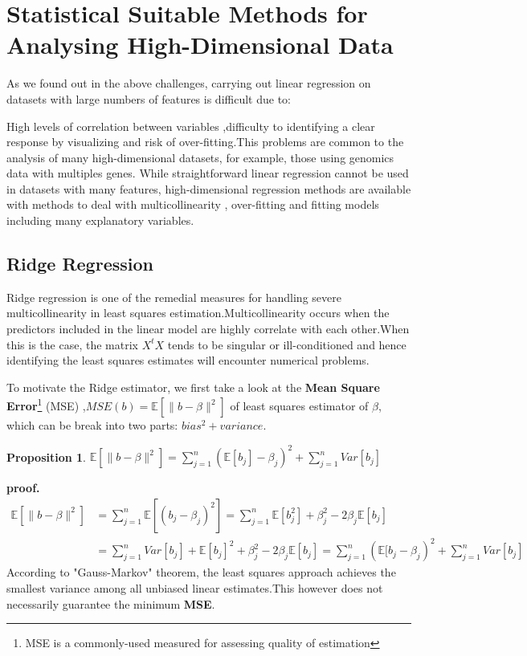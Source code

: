 \documentclass[12pt]{report}
\newtheorem {proposition}{Proposition}[section]  %
\begin{document}
	\section{Statistical Suitable Methods for Analysing High-Dimensional Data}
	As we found out in the above challenges, carrying out linear regression on datasets with large numbers of features is difficult due to: 
	
	High levels of correlation between variables ,difficulty to identifying a clear response by visualizing and risk of over-fitting.This problems are common to the analysis of many high-dimensional datasets, for example, those using genomics data with multiples genes. While straightforward linear regression cannot be used in datasets with many features, high-dimensional regression methods are available with methods to deal with multicollinearity , over-fitting and fitting models including many explanatory variables.
	\subsection{Ridge Regression}
	\label{rre}
	Ridge regression is one of the remedial measures for handling severe multicollinearity in least squares estimation.Multicollinearity occurs when the predictors included in the linear model are highly correlate with each other.When this is the case, the matrix $X^{t}X$ tends to be singular or ill-conditioned and hence identifying the least squares estimates will encounter numerical problems.
	
	To motivate the Ridge estimator, we first take a look at the \textbf{Mean Square Error}\footnote{MSE is a commonly-used measured for assessing quality of estimation} (MSE) ,$MSE(b)=\mathbb{E}[\parallel b-\beta \parallel^{2}]$ of least squares estimator of $\beta$, which can be break into two parts: $bias^{2} + variance$.
	\begin{proposition}
		$	\mathbb{E}[\parallel b-\beta \parallel^{2}]	=\sum_{j=1}^{n}	(\mathbb{E}[b_{j}]-\beta_{j})^{2} + \sum_{j=1}^{n}	Var[b_{j}]$
	\end{proposition}
	\textbf{proof.}
	{\selectfont
		\begin{align*}
			\mathbb{E}[\parallel b-\beta \parallel^{2}]&=\sum_{j=1}^{n}	\mathbb{E}[(b_{j}-\beta_{j})^{2}]
			=\sum_{j=1}^{n}	\mathbb{E}[b_{j}^{2}]+\beta_{j}^{2} -2\beta_{j}\mathbb{E}[b_{j}]\\
			&=\sum_{j=1}^{n}	Var[b_{j}]+\mathbb{E}[b_{j}]^{2}+\beta_{j}^{2} -2\beta_{j}\mathbb{E}[b_{j}]
			=\sum_{j=1}^{n}	(\mathbb{E}[b_{j}-\beta_{j})^{2} + \sum_{j=1}^{n}	Var[b_{j}]
	\end{align*} }
	According to "Gauss-Markov" theorem, the least squares approach achieves the smallest variance among all unbiased linear estimates.This however does not necessarily guarantee the minimum \textbf{MSE}.
	
\end{document}
